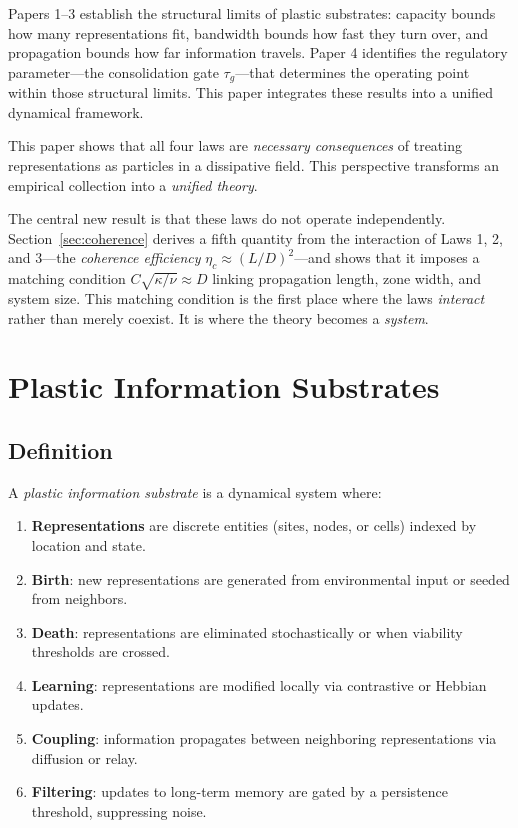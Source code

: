 \documentclass[11pt]{article}
\begin{document}
Papers 1--3 establish the structural limits of plastic substrates: capacity bounds how many representations fit, bandwidth bounds how fast they turn over, and propagation bounds how far information travels. Paper 4 identifies the regulatory parameter---the consolidation gate $\tau_g$---that determines the operating point within those structural limits. This paper integrates these results into a unified dynamical framework.

This paper shows that all four laws are \emph{necessary consequences} of treating representations as particles in a dissipative field. This perspective transforms an empirical collection into a \emph{unified theory}.

The central new result is that these laws do not operate independently. Section~\ref{sec:coherence} derives a fifth quantity from the interaction of Laws 1, 2, and 3---the \emph{coherence efficiency} $\eta_c \approx (L/D)^2$---and shows that it imposes a matching condition $C\sqrt{\kappa/\nu} \approx D$ linking propagation length, zone width, and system size. This matching condition is the first place where the laws \emph{interact} rather than merely coexist. It is where the theory becomes a \emph{system}.

\section{Plastic Information Substrates}

\subsection{Definition}

A \emph{plastic information substrate} is a dynamical system where:
\begin{enumerate}
\item \textbf{Representations} are discrete entities (sites, nodes, or cells) indexed by location and state.
\item \textbf{Birth}: new representations are generated from environmental input or seeded from neighbors.
\item \textbf{Death}: representations are eliminated stochastically or when viability thresholds are crossed.
\item \textbf{Learning}: representations are modified locally via contrastive or Hebbian updates.
\item \textbf{Coupling}: information propagates between neighboring representations via diffusion or relay.
\item \textbf{Filtering}: updates to long-term memory are gated by a persistence threshold, suppressing noise.
\end{enumerate}
\end{document}
